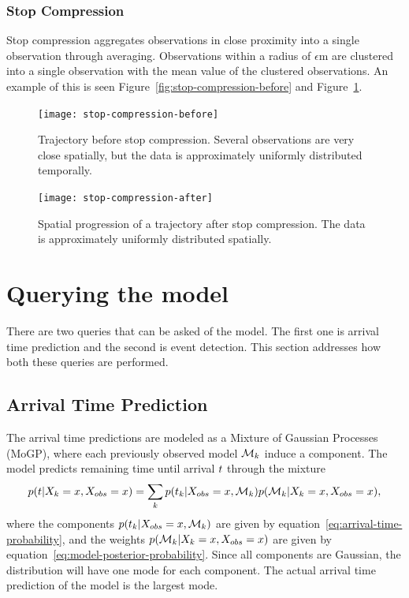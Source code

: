 \subsubsection{Stop Compression}\label{sec:stop-compression}
Stop compression aggregates observations in close proximity into a
single observation through averaging. Observations within a radius of
$\epsilon$m are clustered into a single observation with the mean value of
the clustered observations. An example of this is seen
Figure~\ref{fig:stop-compression-before} and Figure~\ref{fig:stop-compression-after}.
\begin{figure}
  \begin{minipage}{.46\textwidth}
    \texttt{[image: stop-compression-before]}
    \caption{Trajectory before stop compression. Several observations
      are very close spatially, but the data is
      approximately uniformly distributed temporally. }\label{fig:stop-compression-before}
  \end{minipage}
  \hspace{5pt}
  \begin{minipage}{.46\textwidth}
    \texttt{[image: stop-compression-after]}
    \caption{Spatial progression of a trajectory
      after stop compression. The data is
      approximately uniformly distributed spatially.}\label{fig:stop-compression-after}
  \end{minipage}
\end{figure}

\section{Querying the model}
There are two queries that can be asked of the model. The first one is
arrival time prediction and the second is event detection. This
section addresses how both these queries are performed.

\subsection{Arrival Time Prediction}
The arrival time predictions are modeled as a Mixture of Gaussian
Processes (MoGP), where each previously observed model $\mathcal{M}_{k}$ induce a component. The
model predicts remaining time until arrival $t$ through the mixture
\begin{equation}
  \label{eq:arrival-time-probability}
  p(t \vert X_{k} = x, X_{obs} = x) = 
  \sum_{k}p(t_{k} \vert X_{obs} = x, \mathcal{M}_{k})
  p(\mathcal{M}_{k} \vert X_{k} = x, X_{obs} = x),
\end{equation}
where the components $p(t_{k} \vert X_{obs} = x,
\mathcal{M}_{k})$ are given by equation~\ref{eq:arrival-time-probability},
and the weights $p(\mathcal{M}_{k} \vert X_{k} = x, X_{obs} = x)$
are given by equation~\ref{eq:model-posterior-probability}. Since all
components are Gaussian, the distribution will have one mode for each component. The
actual arrival time prediction of the model is the largest mode.

